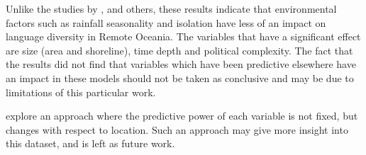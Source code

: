 \documentclass[a4paper,10pt]{article} %
\begin{document}

Unlike the studies by \citet{gavin2012island}, \citet{hua2019ecological} and others, these results indicate that environmental factors such as rainfall seasonality and isolation have less of an impact on language diversity in Remote Oceania. The variables that have a significant effect are size (area and shoreline), time depth and political complexity. The fact that the results did not find that variables which have been predictive elsewhere have an impact in these models should not be taken as conclusive and may be due to limitations of this particular work.


\citet{Pacheco_Coelho_2019} explore an approach where the predictive power of each variable is not fixed, but changes with respect to location. Such an approach may give more insight into this dataset, and is left as future work.
\end{document}
